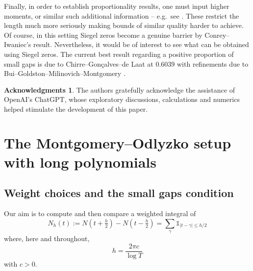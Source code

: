 \documentclass[12pt, oneside]{amsart}
\theoremstyle{definition}
\newtheorem*{ack}{Acknowledgments}
\newcommand{\leqs}{\leqslant }
\newcommand{\eps}{\varepsilon}
\newcommand{\1}{\mathds{1}}
\begin{document}
Finally, 
in order to establish proportionality results, one must input higher moments, or similar such additional information -- e.g.\, see \cite{BGMM,CGGGHB}. These restrict the length much more seriously making bounds of similar quality harder to achieve. Of course, in this setting Siegel zeros become a genuine barrier by Conrey--Iwaniec's result. Nevertheless, it would be of interest to see what can be obtained using Siegel zeros. The current best result regarding a positive proportion of small gaps is due to Chirre--Gon\c{c}alves--de Laat \cite{ChirreGoncalvesdeLaat} at $0.6039$ with refinements due to Bui--Goldston--Milinovich--Montgomery \cite{BGMM}.

\begin{ack}The authors gratefully acknowledge the assistance of OpenAI's ChatGPT, whose  exploratory discussions, calculations and numerics helped stimulate the development of this paper.
\end{ack}

\section{The Montgomery--Odlyzko setup with long polynomials}

\subsection{Weight choices and the small gaps condition}
Our aim is to compute and then compare a weighted integral of 
\[
N_h(t):=N(t+\tfrac{h}{2})-N(t-\tfrac{h}{2})=\sum_{\gamma} \mathds{1}_{|t-\gamma|\leqs h/2}
\] 
where, here and throughout, 
\[
h=\frac{2\pi c}{\log T}
\]
with $c>0$. 

\end{document}
